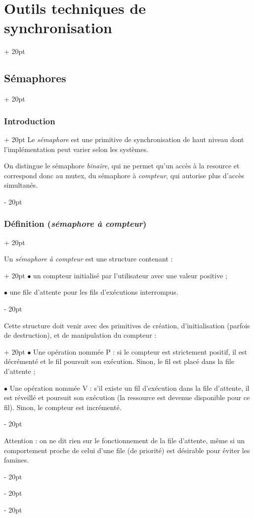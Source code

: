 \documentclass[a4paper, 12pt, twoside]{article}
\newcommand{\ind}[1][20pt]{\advance\leftskip + #1}
\newcommand{\deind}[1][20pt]{\advance\leftskip - #1}
\newenvironment{indt}[2][20pt]{#2 \par \ind[#1]}{\par \deind} %
\begin{document}
\begin{indt}{\section{Outils techniques de synchronisation}}
\begin{indt}{\subsection{Sémaphores}}
\begin{indt}{\subsubsection{Introduction}}
                Le \emph{sémaphore} est une primitive de synchronisation de haut niveau dont l'implémentation peut varier selon les systèmes.

                On distingue le sémaphore \emph{binaire}, qui ne permet qu'un accès à la resource et correspond donc au mutex, du sémaphore à \emph{compteur}, qui autorise plus d'accès simultanés.
            \end{indt}

            \vspace{12pt}
            
            \begin{indt}{\subsubsection{Définition (\emph{sémaphore à compteur})}}
                \label{3.2.2}

                \begin{indt}{Un \emph{sémaphore à compteur} est une structure contenant :}
                    $\bullet$ un compteur initialisé par l'utilisateur avec une valeur positive ;

                    $\bullet$ une file d'attente pour les fils d'exécutions interrompus.
                \end{indt}

                \vspace{12pt}
                
                \begin{indt}{Cette structure doit venir avec des primitives de création, d'initialisation (parfois de destruction), et de manipulation du compteur :}
                    $\bullet$ Une opération nommée P : si le compteur est strictement positif, il est décrémenté et le fil poursuit son exécution. Sinon, le fil est placé dans la file d'attente ;

                    $\bullet$ Une opération nommée V : s'il existe un fil d'exécution dans la file d'attente, il est réveillé et poursuit son exécution (la ressource est devenue disponible pour ce fil).
                    Sinon, le compteur est incrémenté.
                \end{indt}

                \vspace{12pt}
                
                Attention : on ne dit rien sur le fonctionnement de la file d'attente, même si un comportement proche de celui d'une file (de priorité) est désirable pour éviter les famines.


\end{indt}
\end{indt}
\end{indt}
\end{document}
